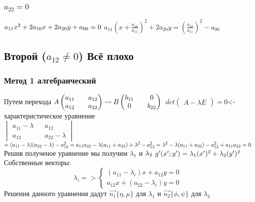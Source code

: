 \documentclass{book}
\begin{document}
\subsubsection{$a_{22}=0$}
$a_{11}x^2+2a_{10}x+2a_{20}y+a_{00}=0\\$
$a_{11}(x+\frac{a_{10}}{a_{11}})^2+2a_{20}y=(\frac{a_{10}}{a_{11}})^2-a_{00}$
\subsection{Второй ($a_{12} \neq 0$) Всё плохо}
\subsubsection{Метод 1 алгебраический}
Путем перехода
$A\begin{pmatrix}
    {a_{11}} && {a_{12}}\\
    {a_{12}} && {a_{22}}
\end{pmatrix}
\leadsto  B
\begin{pmatrix}
    {b_{11}} && {0}\\
    {0} && {b_{22}}
\end{pmatrix}\\
$
$
det\begin{pmatrix}
    A-\lambda E
\end{pmatrix} = 0
$<- характеристическое уравнение\\
$
\begin{vmatrix}
    {a_{11}-\lambda} && {a_{12}}\\
    {a_{12}} && {a_{22}-\lambda}
\end{vmatrix}$
$=(a_{11}-\lambda)(a_{22}-\lambda)-a_{12}^2=a_{11}a_{22}-\lambda(a_{11}+a_{22})+\lambda^2-a_{12}^2=\lambda^2-\lambda(a_{11}+a_{22})-a_{12}^2+a_{11}a_{22}=0\\$
Решив полученое уравнение мы получим $\lambda_1$ и $\lambda_2\\$
$g'(x';y')=\lambda_1(x')^2+\lambda_2(y')^2\\$
Собственные векторы:\\
\begin{equation}\lambda_i=>
    \begin{cases}
        (a_{11}-\lambda_i)x+a_{12}y=0\\
        a_{12}x+(a_{22}-\lambda_i)y=0
    \end{cases}
\end{equation}
Решения данного уравнения дадут $\overrightarrow{n_1}\{\eta,\mu\}$ для $\lambda_1$ и $\overrightarrow{n_2}\{\phi,\psi\}$ для $\lambda_2$\\
\end{document}
